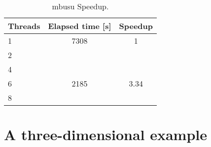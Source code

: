 \begin{table}
  \centering
  \begin{tabular}{l|c|c}
    \hline
    Threads & Elapsed time [s] & Speedup\\
    \hline
    \hline
    1       & 7308             & 1     \\
    2       &                  &       \\
    4       &                  &       \\
    6       & 2185             & 3.34  \\
    8       &                  &       \\
    \hline
  \end{tabular}
  \caption{mbusu Speedup.}
  \label{tab:speedup}
\end{table} 



\section{A three-dimensional example}
